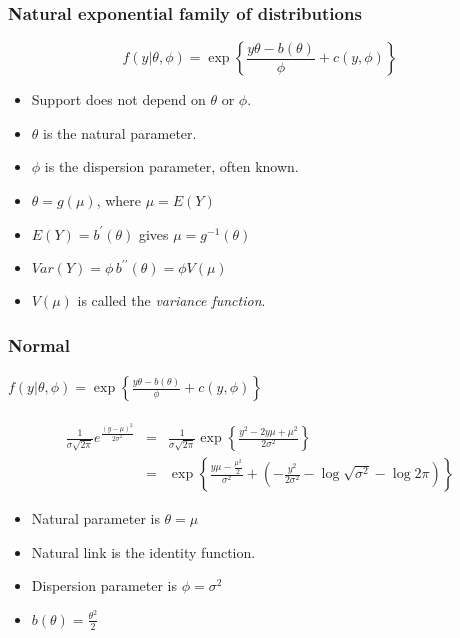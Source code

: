 \documentclass[serif]{beamer} %
\begin{document}
\begin{frame}
\frametitle{Natural exponential family of distributions}
{\LARGE
\begin{displaymath}
    f(y|\theta,\phi) = 
    \exp\left\{ \frac{y\theta-b(\theta)}{\phi} + c(y,\phi)\right\}
\end{displaymath} }
  \begin{itemize}
    \item Support does not depend on $\theta$ or $\phi$.
    \item $\theta$ is the natural parameter.
    \item $\phi$ is the dispersion parameter, often known.
    \item $\theta=g(\mu)$, where $\mu=E(Y)$
    \item $E(Y) = b^\prime(\theta)$ gives $\mu=g^{-1}(\theta)$
    \item $Var(Y) =  \phi \, b^{\prime\prime}(\theta) = \phi V(\mu)$
    \item $V(\mu)$ is called the \emph{variance function}.
  \end{itemize}
\end{frame}

\begin{frame}
\frametitle{Normal}
\framesubtitle{$ f(y|\theta,\phi) = 
    \exp\left\{ \frac{y\theta-b(\theta)}{\phi} + c(y,\phi)\right\}$} 

\begin{eqnarray*}
    \frac{1}{\sigma\sqrt{2\pi}} e^{\frac{(y-\mu)^2}{2\sigma^2}} 
    & = & \frac{1}{\sigma\sqrt{2\pi}}  \exp\left\{ \frac{y^2-2y\mu+\mu^2}{2\sigma^2} \right\}\\
    & = &  \exp\left\{ \frac{y\mu-\frac{\mu^2}{2}}{\sigma^2} + 
           \left( -\frac{y^2}{2\sigma^2} - \log\sqrt{\sigma^2} - \log 2\pi\right)\right\}
\end{eqnarray*} 
  \begin{itemize}
    \item Natural parameter is $\theta=\mu$
    \item Natural link is the identity function.
    \item Dispersion parameter is $\phi=\sigma^2$
    \item $b(\theta) = \frac{\theta^2}{2}$
  \end{itemize}

\end{frame}
\end{document}
